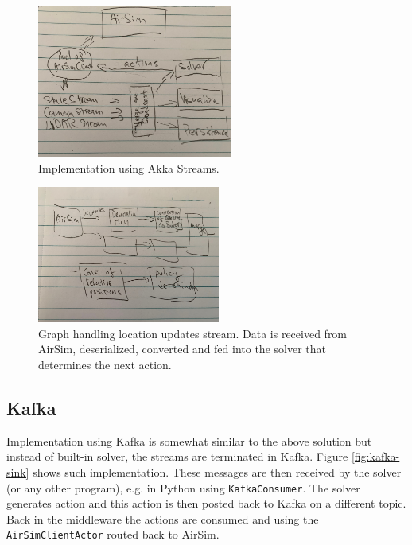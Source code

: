 \documentclass{article}
\begin{document}
\begin{figure}
	\centering
	\includegraphics[height=5cm]{with-flow}
	\caption{Implementation using Akka Streams.}\label{fig:with-flow}
\end{figure}

\begin{figure}
	\centering
	\includegraphics[width=6cm]{flow-in-sketch}
	\caption{Graph handling location updates stream. Data is received from AirSim, deserialized, converted and fed into the solver that determines the next action.}\label{fig:flow-in}
\end{figure}

%

\subsection{Kafka}
Implementation using Kafka is somewhat similar to the above solution but instead of built-in solver, the streams are terminated in Kafka. Figure \ref{fig:kafka-sink} shows such implementation. These messages are then received by the solver (or any other program), e.g. in Python using \verb|KafkaConsumer|. The solver generates action and this action is then posted back to Kafka on a different topic. Back in the middleware the actions are consumed and using the \verb|AirSimClientActor| routed back to AirSim.
\end{document}
